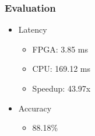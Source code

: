 \documentclass[aspectratio=169]{beamer}
\begin{document}
\begin{frame}
    \frametitle{Evaluation}

    \begin{itemize}
        \item Latency
              \begin{itemize}
                  \item FPGA: 3.85 ms
                  \item CPU: 169.12 ms
                  \item Speedup: 43.97x
              \end{itemize}
        \item Accuracy
              \begin{itemize}
                  \item 88.18\%
              \end{itemize}
    \end{itemize}

\end{frame}
\end{document}
